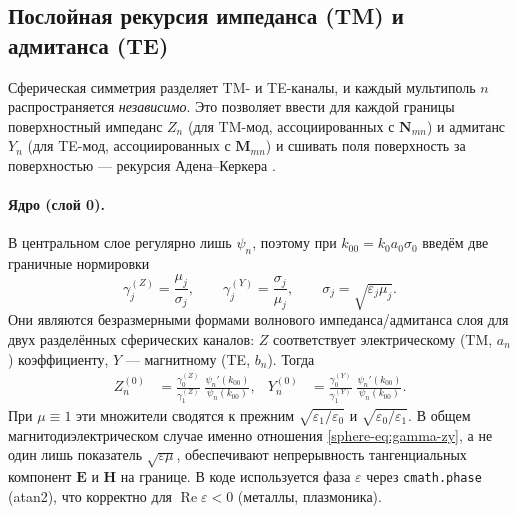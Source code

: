 \documentclass[11pt,a4paper]{article}
\begin{document}
\subsection{Послойная рекурсия импеданса (TM) и адмитанса (TE)}

Сферическая симметрия разделяет TM- и TE-каналы, и каждый мультиполь $n$ распространяется \emph{независимо}. Это позволяет ввести для каждой границы поверхностный импеданс $Z_n$ (для TM-мод, ассоциированных с $\bm{N}_{mn}$) и адмитанс $Y_n$ (для TE-мод, ассоциированных с $\bm{M}_{mn}$) и сшивать поля поверхность за поверхностью --- рекурсия Адена--Керкера \cite{aden1951,bohren1983}.

\paragraph{Ядро (слой 0).} В центральном слое регулярно лишь $\psi_n$, поэтому при $k_{00}=k_0 a_0\sigma_0$ введём две граничные нормировки
\begin{equation}
\gamma_j^{(Z)}=\frac{\mu_j}{\sigma_j},
\qquad
\gamma_j^{(Y)}=\frac{\sigma_j}{\mu_j},
\qquad \sigma_j=\sqrt{\varepsilon_j\mu_j}.
\label{sphere-eq:gamma-zy}
\end{equation}
Они являются безразмерными формами волнового импеданса/адмитанса слоя для двух разделённых сферических каналов: $Z$ соответствует электрическому (TM, $a_n$) коэффициенту, $Y$ --- магнитному (TE, $b_n$). Тогда
\begin{align}
Z_n^{(0)} &= \frac{\gamma_0^{(Z)}}{\gamma_1^{(Z)}}\;\frac{\psi_n'(k_{00})}{\psi_n(k_{00})}, &
Y_n^{(0)} &= \frac{\gamma_0^{(Y)}}{\gamma_1^{(Y)}}\;\frac{\psi_n'(k_{00})}{\psi_n(k_{00})}.
\label{sphere-eq:Z-core}
\end{align}
При $\mu\equiv1$ эти множители сводятся к прежним $\sqrt{\varepsilon_1/\varepsilon_0}$ и $\sqrt{\varepsilon_0/\varepsilon_1}$. В общем магнитодиэлектрическом случае именно отношения \eqref{sphere-eq:gamma-zy}, а не один лишь показатель $\sqrt{\varepsilon\mu}$, обеспечивают непрерывность тангенциальных компонент $\bm E$ и $\bm H$ на границе. В коде используется фаза $\varepsilon$ через \texttt{cmath.phase} (atan2), что корректно для $\operatorname{Re}\varepsilon<0$ (металлы, плазмоника).
\end{document}
